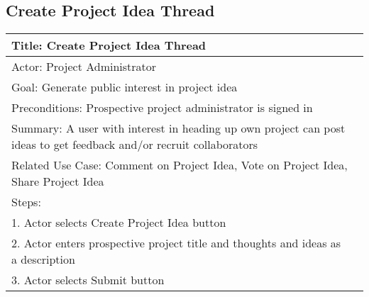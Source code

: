\documentclass[10pt,a4paper]{article}
\begin{document}
\subsection{Create Project Idea Thread}
\begin{tabular}{|p{6cm}|p{6cm}|} \hline
\multicolumn{2}{|p{12cm}|}{Title: Create Project Idea Thread}                                                                                       \\ \hline
\multicolumn{2}{|p{12cm}|}{Actor: Project Administrator}                                                                                                       \\ \hline
\multicolumn{2}{|p{12cm}|}{Goal: Generate public interest in project idea	} \\ \hline
\multicolumn{2}{|p{12cm}|}{Preconditions: Prospective project administrator is signed in	}                                                                                               \\ \hline
\multicolumn{2}{|p{12cm}|}{Summary: A user with interest in heading up own project can post ideas to get feedback and/or recruit collaborators	}                           \\ \hline
\multicolumn{2}{|p{12cm}|}{Related Use Case: Comment on Project Idea, Vote on Project Idea, Share Project Idea}                               \\ \hline
Steps:                                                                              &                                                 \\ \hline
1. Actor selects Create Project Idea button  &                                                 \\ \hline
2. Actor enters prospective project title and thoughts and ideas as a description     &                                                 \\ \hline
3. Actor selects Submit button&                                                 \\ \hline

\end{tabular}
\end{document}
